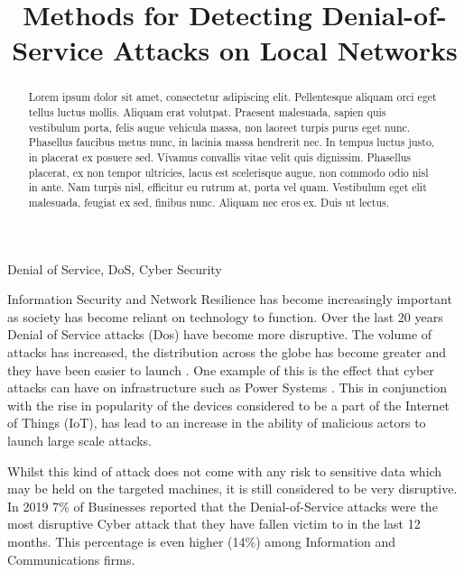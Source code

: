 \documentclass[conference, a4paper]{IEEEtran}
\begin{document}
\title{Methods for Detecting Denial-of-Service Attacks on Local Networks\\
}

\author{
}

\maketitle

\begin{abstract}
    Lorem ipsum dolor sit amet, consectetur adipiscing elit. Pellentesque aliquam orci eget tellus luctus mollis. Aliquam erat volutpat. Praesent malesuada, sapien quis vestibulum porta, felis augue vehicula massa, non laoreet turpis purus eget nunc. Phasellus faucibus metus nunc, in lacinia massa hendrerit nec. In tempus luctus justo, in placerat ex posuere sed. Vivamus convallis vitae velit quis dignissim. Phasellus placerat, ex non tempor ultricies, lacus est scelerisque augue, non commodo odio nisl in ante. Nam turpis nisl, efficitur eu rutrum at, porta vel quam. Vestibulum eget elit malesuada, feugiat ex sed, finibus nunc. Aliquam nec eros ex. Duis ut lectus.
    \newline
\end{abstract}

\begin{IEEEkeywords}
    Denial of Service, DoS, Cyber Security
\end{IEEEkeywords}

    Information Security and Network Resilience has become increasingly important as society has become reliant on technology to function.
    Over the last 20 years Denial of Service attacks (Dos) have become more disruptive. The volume of attacks has increased, the distribution across the globe has become greater and they have been easier to launch \cite{20_years_of_DDOS}.
    One example of this is the effect that cyber attacks can have on infrastructure such as Power Systems \cite{DDOS_power_systems}. 
    This in conjunction with the rise in popularity of the devices considered to be a part of the Internet of Things (IoT), has lead to an increase in the ability of malicious actors to launch large scale attacks.

    Whilst this kind of attack does not come with any risk to sensitive data which may be held on the targeted machines, it is still considered to be very disruptive.
    In 2019 7\% of Businesses reported that the Denial-of-Service attacks were the most disruptive Cyber attack that they have fallen victim to in the last 12 months.
    This percentage is even higher (14\%) among Information and Communications firms.\cite{government_security_survey}
\end{document}
